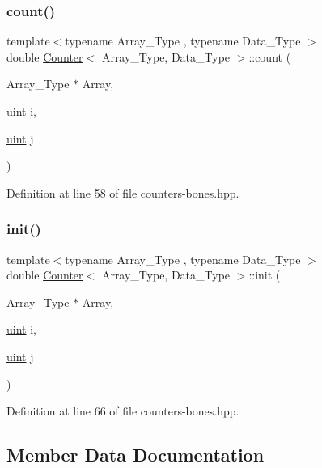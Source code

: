\subsubsection{\texorpdfstring{count()}{count()}}
{\footnotesize\ttfamily template$<$typename Array\+\_\+\+Type , typename Data\+\_\+\+Type $>$ \\
double \hyperlink{class_counter}{Counter}$<$ Array\+\_\+\+Type, Data\+\_\+\+Type $>$\+::count (\begin{DoxyParamCaption}\item[{Array\+\_\+\+Type $\ast$}]{Array,  }\item[{\hyperlink{typedefs_8hpp_a91ad9478d81a7aaf2593e8d9c3d06a14}{uint}}]{i,  }\item[{\hyperlink{typedefs_8hpp_a91ad9478d81a7aaf2593e8d9c3d06a14}{uint}}]{j }\end{DoxyParamCaption})\hspace{0.3cm}{\ttfamily [inline]}}



Definition at line 58 of file counters-\/bones.\+hpp.

\mbox{\label{class_counter_ae0451979ddc51a5fbf00de78c37d3216}} 
\subsubsection{\texorpdfstring{init()}{init()}}
{\footnotesize\ttfamily template$<$typename Array\+\_\+\+Type , typename Data\+\_\+\+Type $>$ \\
double \hyperlink{class_counter}{Counter}$<$ Array\+\_\+\+Type, Data\+\_\+\+Type $>$\+::init (\begin{DoxyParamCaption}\item[{Array\+\_\+\+Type $\ast$}]{Array,  }\item[{\hyperlink{typedefs_8hpp_a91ad9478d81a7aaf2593e8d9c3d06a14}{uint}}]{i,  }\item[{\hyperlink{typedefs_8hpp_a91ad9478d81a7aaf2593e8d9c3d06a14}{uint}}]{j }\end{DoxyParamCaption})\hspace{0.3cm}{\ttfamily [inline]}}



Definition at line 66 of file counters-\/bones.\+hpp.



\subsection{Member Data Documentation}
\mbox{\label{class_counter_a804d287379ef9b4204a0838edcce3b71}} 
